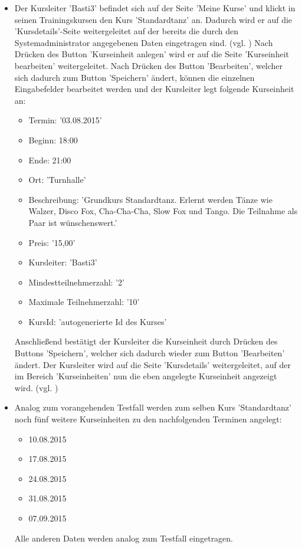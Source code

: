 \documentclass[a4paper]{scrreprt}
\begin{document}
\begin{itemize}
			\item {} 
			Der Kursleiter 'Basti3' befindet sich auf der Seite 'Meine Kurse' und klickt in seinen Trainingskursen den Kurs 'Standardtanz' an. Dadurch wird er auf die 'Kursdetails'-Seite weitergeleitet auf der bereits die durch den Systemadministrator angegebenen Daten eingetragen sind. (vgl. ) Nach Drücken des Button 'Kurseinheit anlegen' wird er auf die Seite 'Kurseinheit bearbeiten' weitergeleitet. Nach Drücken des Button 'Bearbeiten', welcher sich dadurch zum Button 'Speichern' ändert, können die einzelnen Eingabefelder bearbeitet werden und der Kursleiter legt folgende Kurseinheit an:
			\begin{itemize}
				\item Termin: '03.08.2015'
				\item Beginn: 18:00
				\item Ende: 21:00
				\item Ort: 'Turnhalle'
				\item Beschreibung: 'Grundkurs Standardtanz. Erlernt werden Tänze wie Walzer, Disco Fox, Cha-Cha-Cha, Slow Fox und Tango. Die Teilnahme als Paar ist wünschenswert.'
				\item Preis: '15,00'
				\item Kursleiter: 'Basti3'
				\item Mindestteilnehmerzahl: '2'
				\item Maximale Teilnehmerzahl: '10'
				\item KursId: 'autogenerierte Id des Kurses'
			\end{itemize}	
			Anschließend bestätigt der Kursleiter die Kurseinheit durch Drücken des Buttons 'Speichern', welcher sich dadurch wieder zum Button 'Bearbeiten' ändert. Der Kursleiter wird auf die Seite 'Kursdetails' weitergeleitet, auf der im Bereich 'Kurseinheiten' nun die eben angelegte Kurseinheit angezeigt wird. (vgl. )
		
			\item {} 
			Analog zum vorangehenden Testfall  werden zum selben Kurs 'Standardtanz' noch fünf weitere Kurseinheiten zu den nachfolgenden Terminen angelegt:
			\begin{itemize}
				\item 10.08.2015
				\item 17.08.2015
				\item 24.08.2015
				\item 31.08.2015
				\item 07.09.2015
			\end{itemize}		
			Alle anderen Daten werden analog zum Testfall  eingetragen.
			

\end{itemize}
\end{document}
